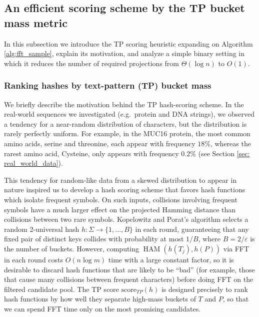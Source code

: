 \documentclass{article}
\theoremstyle{definition}
\newcommand{\score}{\text{score}}
\newcommand{\KP}{Kopelowitz and Porat}
\begin{document}
\subsection{An efficient scoring scheme by the TP bucket mass metric}
In this subsection we introduce the TP scoring heuristic expanding on Algorithm \ref{alg:fft_sample}, explain its
motivation, and analyze a simple binary setting in which it reduces the number of required projections from $\Theta(\log n)$ to $O(1)$.

\subsubsection{Ranking hashes by text-pattern (TP) bucket mass}

We briefly describe the motivation behind the TP hash-scoring scheme. 
In the real-world sequences we investigated (e.g.\ protein and DNA strings), we observed a tendency for a near-random distribution of characters, but the distribution is rarely perfectly uniform. For example, in the MUC16 protein, the most common amino acids, serine and threonine, each appear with frequency $18\%$, whereas the rarest amino acid, Cysteine, only appears with frequency $0.2\%$ (see Section \ref{sec: real_world_data}).

This tendency for random-like data from a skewed distribution to appear in nature inspired us to develop a hash scoring scheme that favors hash functions which isolate frequent symbols. 
On such inputs, collisions involving frequent symbols have a much larger effect on the projected Hamming distance than collisions between two rare symbols. \KP's algorithm selects a random 2-universal hash $h:\Sigma\to\{1,\dots,B\}$ in each round, guaranteeing that any fixed pair of distinct keys collides with probability at most $1/B$, where $B=2/\varepsilon$ is the number of buckets.
However, computing $\operatorname{HAM}(h(T_j),h(P))$ via FFT in each round costs $O(n\log m)$ time with a large constant factor, so it is desirable to discard hash functions that are likely to be ``bad'' (for example, those that cause many collisions between frequent characters) before doing FFT on the filtered candidate pool. 
The TP score $\score_{TP}(h)$ is designed precisely to rank hash functions by how well they separate high-mass buckets of $T$ and $P$, so that we can spend FFT time only on the most promising candidates.
\end{document}
